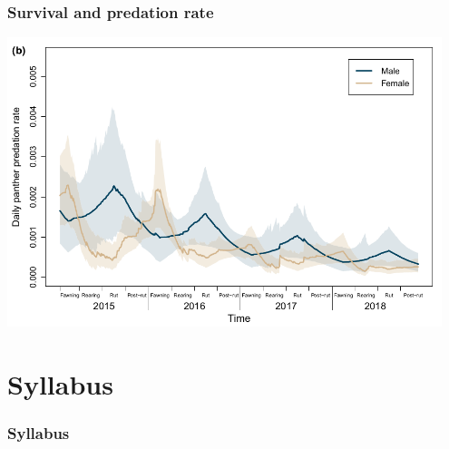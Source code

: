 \documentclass[color=usenames,dvipsnames]{beamer}
\begin{document}
\begin{frame}
  \frametitle{Survival and predation rate}
  \centering
  \includegraphics[width=0.95\textwidth]{figs/deer-pred-time} \\
\end{frame}






\section{Syllabus}




\begin{frame}
  \frametitle{Syllabus}
  \begin{columns}%
    \begin{column}{0.5\textwidth}
    \end{column}
  \end{columns}
\end{frame}
\end{document}
